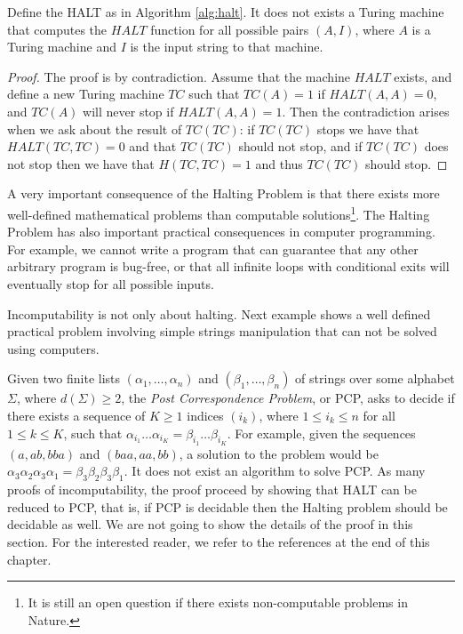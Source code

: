 \begin{theorem}
\label{th:halting-problem}
Define the HALT as in Algorithm \ref{alg:halt}. It does not exists a Turing machine that computes the $HALT$ function for all possible pairs $(A, I)$, where $A$ is a Turing machine and $I$ is the input string to that machine.
\end{theorem}
\begin{proof}
The proof is by contradiction. Assume that the machine $HALT$  exists, and define a new Turing machine $TC$ such that $TC(A) = 1$ if $HALT(A,A) = 0$, and $TC(A)$ will never stop if $HALT(A,A) = 1$. Then the contradiction arises when we ask about the result of $TC(TC)$: if $TC(TC)$ stops we have that $HALT(TC,TC) = 0$ and that $TC(TC)$ should not stop, and if $TC(TC)$ does not stop then we have that $H(TC,TC) = 1$ and thus $TC(TC)$ should stop.
\end{proof}

A very important consequence of the Halting Problem is that there exists more well-defined mathematical problems than computable solutions\footnote{It is still an open question if there exists non-computable problems in Nature.}. The Halting Problem has also important practical consequences in computer programming. For example, we cannot write a program that can guarantee that any other arbitrary program is bug-free, or that all infinite loops with conditional exits will eventually stop for all possible inputs.

Incomputability is not only about halting. Next example shows a well defined practical problem involving simple strings manipulation that can not be solved using computers.

\begin{example}
\label{ex:PCP}
Given two finite lists $\left( \alpha_1, \ldots, \alpha_n \right)$ and $\left( \beta_1, \ldots, \beta_n \right)$ of strings over some alphabet $\Sigma$, where $d(\Sigma) \ge 2$, the \emph{Post Correspondence Problem}, or PCP, asks to decide if there exists a sequence of $K \geq 1$ indices $(i_k)$, where $1 \le i_k \le n$ for all $1 \le k \le K$, such that $\alpha_{i_1} \ldots \alpha_{i_K} = \beta_{i_1} \ldots \beta_{i_K}$. For example, given the sequences $(a, ab, bba)$ and $(baa, aa, bb)$, a solution to the problem would be $\alpha_3 \alpha_2 \alpha_3 \alpha_1 = \beta_{3} \beta_{2} \beta_{3} \beta_{1}$. It does not exist an algorithm to solve PCP. As many proofs of incomputability, the proof proceed by showing that HALT can be reduced to PCP, that is, if PCP is decidable then the Halting problem should be decidable as well. We are not going to show the details of the proof in this section. For the interested reader, we refer to the references at the end of this chapter.
\end{example}

